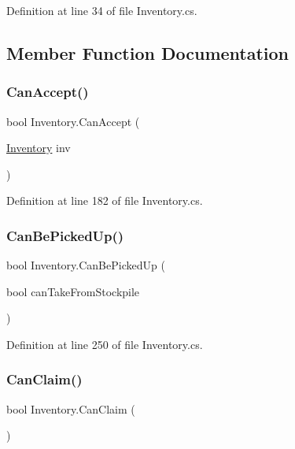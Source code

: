Definition at line 34 of file Inventory.\+cs.



\subsection{Member Function Documentation}
\mbox{\label{class_inventory_a07fdb83a12132708e4435914346dade2}} 
\subsubsection{\texorpdfstring{Can\+Accept()}{CanAccept()}}
{\footnotesize\ttfamily bool Inventory.\+Can\+Accept (\begin{DoxyParamCaption}\item[{\hyperlink{class_inventory}{Inventory}}]{inv }\end{DoxyParamCaption})}



Definition at line 182 of file Inventory.\+cs.

\mbox{\label{class_inventory_ae36dfb1d29316cd8dc4e7d8bda8c60f8}} 
\subsubsection{\texorpdfstring{Can\+Be\+Picked\+Up()}{CanBePickedUp()}}
{\footnotesize\ttfamily bool Inventory.\+Can\+Be\+Picked\+Up (\begin{DoxyParamCaption}\item[{bool}]{can\+Take\+From\+Stockpile }\end{DoxyParamCaption})}



Definition at line 250 of file Inventory.\+cs.

\mbox{\label{class_inventory_a689d3f5140a9dccf4c783f190634bbe8}} 
\subsubsection{\texorpdfstring{Can\+Claim()}{CanClaim()}}
{\footnotesize\ttfamily bool Inventory.\+Can\+Claim (\begin{DoxyParamCaption}{ }\end{DoxyParamCaption})}



